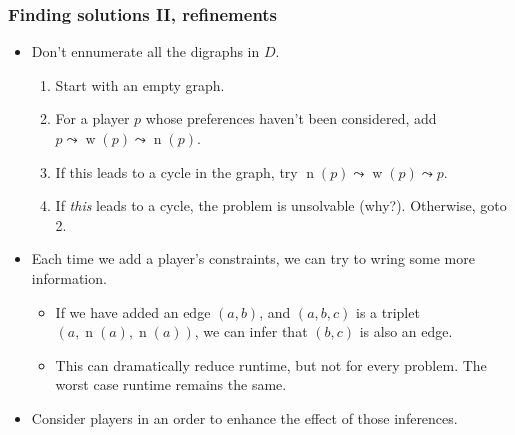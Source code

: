 \documentclass[svgnames]{beamer}
\DeclareMathOperator{\w}{w}
\DeclareMathOperator{\n}{n}
\begin{document}
\begin{frame}
\frametitle{Finding solutions II, refinements}
\begin{itemize}
    \item<1-> Don't ennumerate all the digraphs in $D$.
    \begin{enumerate}
        \item<2-> Start with an empty graph.
        \item<3-> For a player $p$ whose preferences haven't been considered, add $p \leadsto \w(p) \leadsto \n(p)$.
        \item<4-> If this leads to a cycle in the graph, try $\n(p) \leadsto \w(p) \leadsto p$.
        \item<5-> If \emph{this} leads to a cycle, the problem is unsolvable (why?). Otherwise, goto 2.
    \end{enumerate}
    \item<6-> Each time we add a player's constraints, we can try to wring some more information.
    \begin{itemize}
        \item<7-> If we have added an edge $(a, b)$, and $(a, b, c)$ is a triplet $(a, \n(a), \n(a))$, we can infer that $(b,c)$ is also an edge.
        \item<8-> This can dramatically reduce runtime, but not for every problem. The worst case runtime remains the same.
    \end{itemize}
    \item<9-> Consider players in an order to enhance the effect of those inferences.
\end{itemize}
\end{frame}
\end{document}
